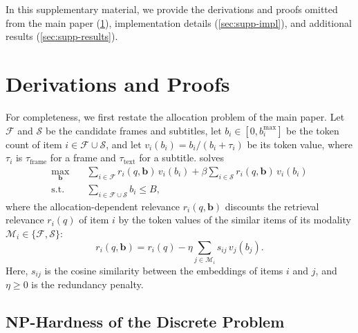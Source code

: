 \maketitlesupplementary

\setcounter{figure}{8}\setcounter{table}{3}\setcounter{equation}{11}
\setcounter{section}{0}
\raggedbottom  %
\renewcommand{\qedsymbol}{}  %

In this supplementary material, we provide the derivations and proofs omitted from the main paper (\cref{sec:supp-proofs}), implementation details (\cref{sec:supp-impl}), and additional results (\cref{sec:supp-results}).

\section{Derivations and Proofs}
\label{sec:supp-proofs}

For completeness, we first restate the allocation problem of the main paper. Let $\mathcal F$ and $\mathcal S$ be the candidate frames and subtitles, let $b_i\in[0,b_i^{\max}]$ be the token count of item $i\in\mathcal F\cup\mathcal S$, and let $v_i(b_i)=b_i/(b_i+\tau_i)$ be its token value, where $\tau_i$ is $\tau_{\text{frame}}$ for a frame and $\tau_{\text{text}}$ for a subtitle. \name solves
\begin{equation}
\begin{aligned}
  \max_{\mathbf b}\quad & \sum_{i\in\mathcal F} r_i(q,\mathbf b)\,v_i(b_i)+\beta\sum_{i\in\mathcal S} r_i(q,\mathbf b)\,v_i(b_i)\\
  \text{s.t.}\quad & \sum_{i\in\mathcal F\cup\mathcal S} b_i\le B ,
\end{aligned}
\label{eq:supp-allocation}
\end{equation}
where the allocation-dependent relevance $r_i(q,\mathbf b)$ discounts the retrieval relevance $r_i(q)$ of item $i$ by the token values of the similar items of its modality $\mathcal M_i\in\{\mathcal F,\mathcal S\}$:
\begin{equation}
  r_i(q,\mathbf b)=r_i(q)-\eta\sum_{j\in\mathcal M_i}s_{ij}\,v_j(b_j) .
\label{eq:supp-cond}
\end{equation}
Here, $s_{ij}$ is the cosine similarity between the embeddings of items $i$ and $j$, and $\eta\ge0$ is the redundancy penalty.

\subsection{NP-Hardness of the Discrete Problem}
\label{sec:supp-nphard}

